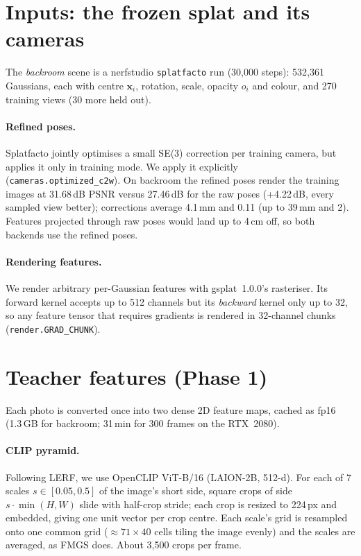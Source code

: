 \documentclass[11pt,a4paper]{article}
\newcommand{\code}[1]{\texttt{#1}}
\newcommand{\vect}[1]{\mathbf{#1}}
\begin{document}
\section{Inputs: the frozen splat and its cameras}

The \emph{backroom} scene is a nerfstudio \code{splatfacto} run (30{,}000 steps): 532{,}361 Gaussians, each with
centre $\vect{x}_i$, rotation, scale, opacity $o_i$ and colour, and 270 training views (30 more held out).

\paragraph{Refined poses.} Splatfacto jointly optimises a small SE(3) correction per training camera, but applies
it only in training mode. We apply it explicitly (\code{cameras.optimized\_c2w}). On backroom the refined poses
render the training images at 31.68\,dB PSNR versus 27.46\,dB for the raw poses (+4.22\,dB, every sampled view
better); corrections average 4.1\,mm and 0.11\textdegree{} (up to 39\,mm and 2\textdegree). Features projected
through raw poses would land up to 4\,cm off, so both backends use the refined poses.

\paragraph{Rendering features.} We render arbitrary per-Gaussian features with gsplat~1.0.0's rasteriser. Its
forward kernel accepts up to 512 channels but its \emph{backward} kernel only up to 32, so any feature tensor that
requires gradients is rendered in 32-channel chunks (\code{render.GRAD\_CHUNK}).

\section{Teacher features (Phase 1)}

Each photo is converted once into two dense 2D feature maps, cached as fp16 (1.3\,GB for backroom; 31\,min for
300 frames on the RTX~2080).

\paragraph{CLIP pyramid.} Following LERF, we use OpenCLIP ViT-B/16 (LAION-2B, 512-d). For each of 7 scales
$s \in [0.05, 0.5]$ of the image's short side, square crops of side $s\cdot\min(H,W)$ slide with half-crop
stride; each crop is resized to 224\,px and embedded, giving one unit vector per crop centre. Each scale's grid is
resampled onto one common grid ($\approx 71\times40$ cells tiling the image evenly) and the scales are averaged,
as FMGS does. About 3{,}500 crops per frame.
\end{document}
